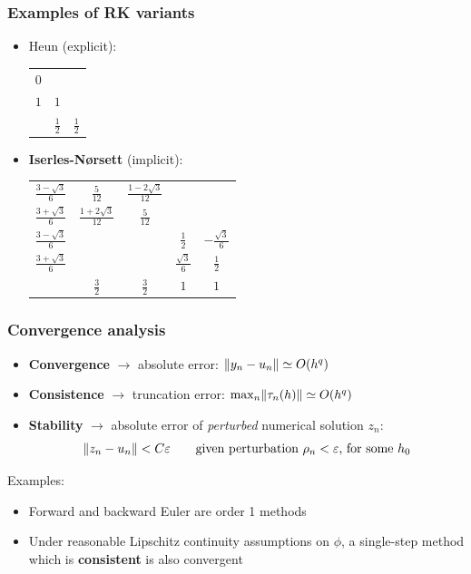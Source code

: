 \documentclass{beamer}
\begin{document}
\begin{frame} %
	\frametitle{Examples of RK variants}
	\begin{itemize}
		\item Heun (explicit):
		\begin{center}
			\begin{tabular}{c|cc}
				$0$ &     & \\
				$1$ & $1$ & \\
				\hline
				& $\frac 1 2$ & $\frac 1 2$
			\end{tabular}
		\end{center}
		\item \textbf{Iserles-Nørsett} (implicit):
		\begin{center}
			\begin{tabular}{c|cccc}
				$\frac{3-\sqrt{3}}{6}$ & $\frac{5}{12}$ & $\frac{1-2\sqrt{3}}{12}$ & & \\
				$\frac{3+\sqrt{3}}{6}$ & $\frac{1+2\sqrt{3}}{12}$ & $\frac{5}{12}$ & & \\
				$\frac{3-\sqrt{3}}{6}$ & & & $\frac{1}{2}$ & $-\frac{\sqrt{3}}{6}$ \\
				$\frac{3+\sqrt{3}}{6}$ & & & $\frac{\sqrt{3}}{6}$ & $\frac{1}{2}$ \\
				\hline
				& $\frac{3}{2}$ & $\frac{3}{2}$ & $1$ & $1$
				\end{tabular}
		\end{center}
	\end{itemize}
\end{frame}


\begin{frame} %
	\frametitle{Convergence analysis}
	\begin{itemize}
		\item \textbf{Convergence} $\to$ absolute error: $\lVert y_n - u_n\rVert \simeq O(h^q)$
		\item \textbf{Consistence} $\to$ truncation error: $\max_n \lVert\tau_n(h)\rVert \simeq O(h^q)$
		\item \textbf{Stability} $\to$ absolute error of \textit{perturbed} numerical solution $z_n$:
		$$ 	\lVert z_n-u_n\rVert < C \varepsilon \qquad
		\text{given perturbation } \rho_n < \varepsilon \text{, for some } h_0 $$
	\end{itemize}
	\pause
	Examples:
	\begin{itemize}
		\item Forward and backward Euler are order 1 methods
		\item Under reasonable Lipschitz continuity assumptions on $\phi$, a single-step method which is \textbf{consistent} is also convergent
	\end{itemize}
\end{frame}
\end{document}
